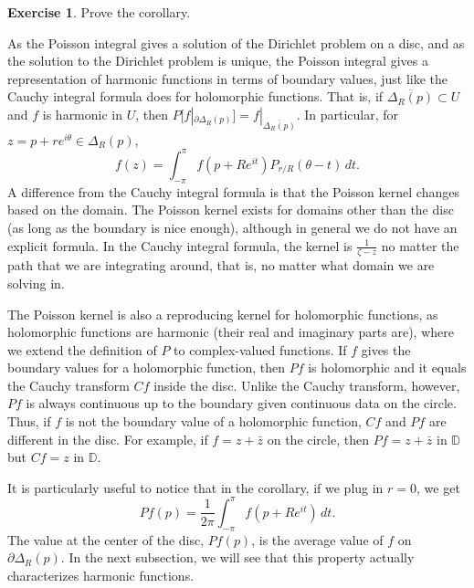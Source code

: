 \documentclass[12pt,openany]{book}
\newcommand{\R}{{\mathbb{R}}}
\newcommand{\D}{{\mathbb{D}}}
\theoremstyle{plain}
\theoremstyle{remark}
\theoremstyle{definition}
\newenvironment{exbox}{%
    \def\FrameCommand{\vrule width 1pt \relax\hspace{10pt}}%
    \MakeFramed{\advance\hsize-\width\FrameRestore}%
}{%
    \endMakeFramed
}
\theoremstyle{exercise}
\newtheorem{exercise}{Exercise}[section]
\theoremstyle{example}
\begin{document}
\begin{exbox}
\begin{exercise}
Prove the corollary.
\end{exercise}
\end{exbox}

As the Poisson integral gives a solution of the Dirichlet problem on a disc,
and as the solution to the Dirichlet problem is unique,
the Poisson integral gives
a representation of harmonic functions in terms of boundary values, just
like the Cauchy integral formula does for holomorphic functions.
That is, if $\overline{\Delta_R(p)} \subset U$ and $f$ is harmonic in $U$,
then $P[f|_{\partial \Delta_R(p)}] = f|_{\overline{\Delta_R(p)}}$.
In particular, for $z = p+re^{i\theta} \in \Delta_R(p)$,
\begin{equation*}
f(z) = \int_{-\pi}^\pi f(p+Re^{it}) P_{r/R}(\theta-t) \, dt .
\end{equation*}
A difference from the Cauchy integral formula is that the Poisson kernel
changes based on the domain.  The Poisson kernel exists for
domains other than the disc (as long as the boundary is nice enough), although
in general we do not have an explicit formula.  In
the Cauchy integral formula, the kernel is $\frac{1}{\zeta-z}$
no matter the path that we are integrating around, that is, no matter
what domain we are solving in.

The Poisson kernel is also a reproducing kernel for
holomorphic functions, as holomorphic functions are harmonic
(their real and imaginary parts are),
where we extend the definition of $P$
to complex-valued functions.
If $f$ gives the boundary
values for a holomorphic function, then $Pf$ is holomorphic and it equals
the Cauchy transform $Cf$ inside the disc.  Unlike the
Cauchy transform, however, $Pf$ is always continuous up to the boundary given
continuous data on the circle.  Thus, if $f$ is not the boundary value of
a holomorphic function, $Cf$ and $Pf$ are different in the disc.
For example, if $f=z+\bar{z}$ on the circle, then $Pf = z+\bar{z}$ in $\D$
but $Cf = z$ in $\D$.


It is particularly useful to notice that
in the corollary, if we plug in $r=0$, we get
\begin{equation} \label{eq:averageofPf}
Pf(p) = \frac{1}{2\pi} \int_{-\pi}^{\pi}f(p + R e^{it}) \, dt .
\end{equation}
The value at the center of the disc, $Pf(p)$, is the average 
value of $f$ on $\partial \Delta_R(p)$.
In the next subsection, we will see that this property actually characterizes
harmonic functions.
\end{document}
